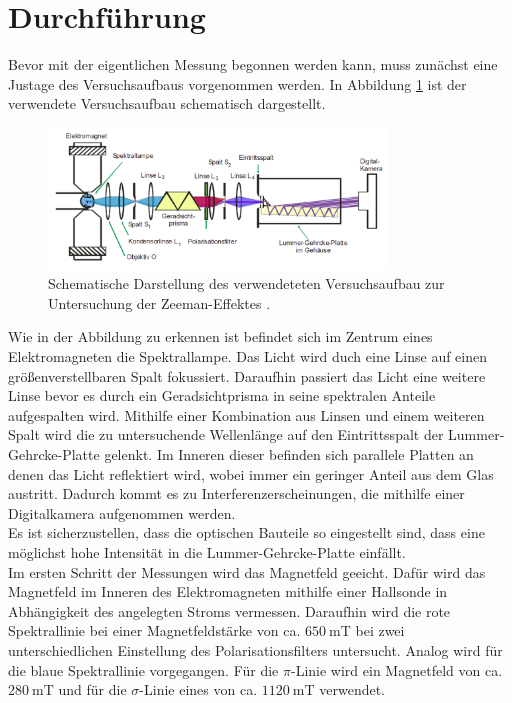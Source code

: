 \section{Durchführung}
Bevor mit der eigentlichen Messung begonnen werden kann, muss zunächst eine Justage des Versuchsaufbaus
vorgenommen werden. In Abbildung \ref{fig:aufbau} ist der verwendete Versuchsaufbau schematisch 
dargestellt.
\begin{figure}[H]
    \centering
    \includegraphics[width=0.8\textwidth]{../images/Aufbau.png}
    \caption{Schematische Darstellung des verwendeteten Versuchsaufbau zur Untersuchung der Zeeman-Effektes \cite{anleitung}.}
    \label{fig:aufbau}
\end{figure} \noindent
Wie in der Abbildung zu erkennen ist befindet sich im Zentrum eines Elektromagneten die Spektrallampe. Das Licht 
wird duch eine Linse auf einen größenverstellbaren Spalt fokussiert. Daraufhin passiert das Licht eine 
weitere Linse bevor es durch ein Geradsichtprisma in seine spektralen Anteile aufgespalten wird. 
Mithilfe einer Kombination aus Linsen und einem weiteren Spalt wird die zu untersuchende Wellenlänge 
auf den Eintrittsspalt der Lummer-Gehrcke-Platte gelenkt. Im Inneren dieser befinden sich parallele Platten 
an denen das Licht reflektiert wird, wobei immer ein geringer Anteil aus dem Glas austritt. 
Dadurch kommt es zu Interferenzerscheinungen, die mithilfe einer Digitalkamera aufgenommen werden.\\
Es ist sicherzustellen, dass die optischen Bauteile so eingestellt sind, dass eine möglichst hohe 
Intensität in die Lummer-Gehrcke-Platte einfällt. \\
Im ersten Schritt der Messungen wird das Magnetfeld geeicht. Dafür wird das Magnetfeld im Inneren 
des Elektromagneten mithilfe einer Hallsonde in Abhängigkeit des angelegten Stroms vermessen. 
Daraufhin wird die rote Spektrallinie bei einer Magnetfeldstärke von ca. $\SI{650}{\milli\tesla}$ bei zwei 
unterschiedlichen Einstellung des Polarisationsfilters untersucht. Analog wird für die blaue 
Spektrallinie vorgegangen. Für die $\pi$-Linie wird ein Magnetfeld von ca. $\SI{280}{\milli\tesla}$
und für die $\sigma$-Linie eines von ca. $\SI{1120}{\milli\tesla}$ verwendet.